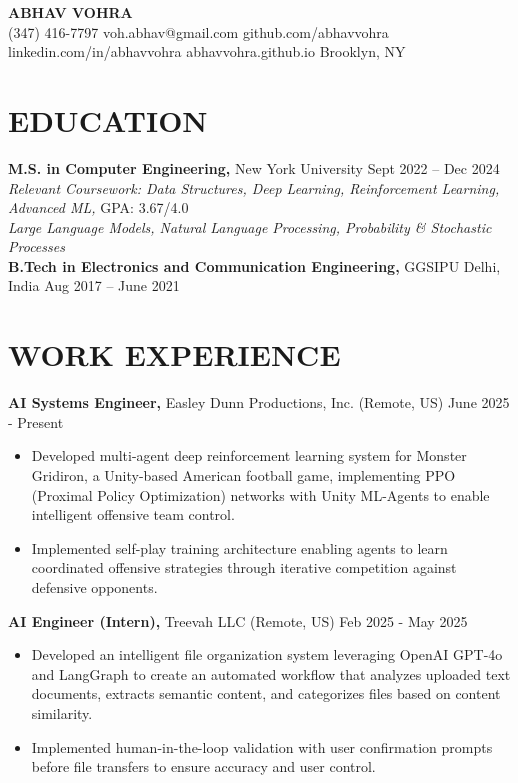 \documentclass[10pt, letterpaper]{article}
\begin{document}
\begin{center}
    {\LARGE \textbf{ABHAV VOHRA}}\\[4pt]
    (347) 416-7797 \quad 
    voh.abhav@gmail.com \quad
    github.com/abhavvohra \quad
    linkedin.com/in/abhavvohra \quad
    abhavvohra.github.io \quad
    Brooklyn, NY 
\end{center}

\section{EDUCATION}
\textbf{M.S. in Computer Engineering,} New York University \hfill Sept 2022 – Dec 2024 \\
\textit{Relevant Coursework: Data Structures, Deep Learning, Reinforcement Learning, Advanced ML,} \hfill GPA: 3.67/4.0 \\
\textit{Large Language Models, Natural Language Processing, Probability \& Stochastic Processes} 
\\
\textbf{B.Tech in Electronics and Communication Engineering,} GGSIPU Delhi, India \hfill Aug 2017 – June 2021 



\section{WORK EXPERIENCE}

\textbf{AI Systems Engineer,} Easley Dunn Productions, Inc. (Remote, US) \hfill June 2025 - Present
\vspace{-0.5em}
\begin{itemize}[leftmargin=*, itemsep=0pt, topsep=0pt, partopsep=0pt, parsep=0pt]
\item Developed multi-agent deep reinforcement learning system for Monster Gridiron, a Unity-based American football game, implementing PPO (Proximal Policy Optimization) networks with Unity ML-Agents to enable intelligent offensive team control.
\item Implemented self-play training architecture enabling agents to learn coordinated offensive strategies through iterative competition against defensive opponents.
\end{itemize}

\textbf{AI Engineer (Intern),} Treevah LLC (Remote, US) \hfill Feb 2025 - May 2025 
\vspace{-0.5em}
\begin{itemize}[leftmargin=*, itemsep=0pt, topsep=0pt, partopsep=0pt, parsep=0pt]
\item Developed an intelligent file organization system leveraging OpenAI GPT-4o and LangGraph to create an automated workflow that analyzes uploaded text documents, extracts semantic content, and categorizes files based on content similarity.
\item Implemented human-in-the-loop validation with user confirmation prompts before file transfers to ensure accuracy and user control.
\end{itemize}
\end{document}
